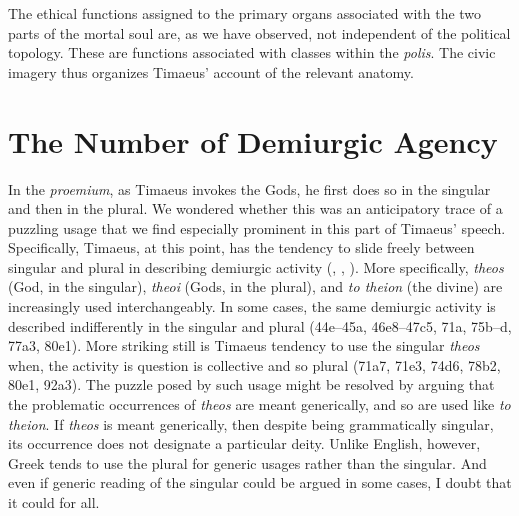 The ethical functions assigned to the primary organs associated with the two parts of the mortal soul are, as we have observed, not independent of the political topology. These are functions associated with classes within the \emph{polis}. The civic imagery thus organizes Timaeus' account of the relevant anatomy. 


\section{The Number of Demiurgic Agency} %
\label{sec:the_number_of_demiurgic_agency}

In the \emph{proemium}, as Timaeus invokes the Gods, he first does so in the singular and then in the plural. We wondered whether this was an anticipatory trace of a puzzling usage that we find especially prominent in this part of Timaeus' speech. Specifically, Timaeus, at this point, has the tendency to slide freely between singular and plural in describing demiurgic activity (\citealt[280]{Cornford:1935fk}, \citealt[169]{Grube:1935ad}, \citealt[608]{Cherniss:1944aa}). More specifically, \emph{theos} (God, in the singular), \emph{theoi} (Gods, in the plural), and \emph{to theion} (the divine) are increasingly used interchangeably. In some cases, the same demiurgic activity is described indifferently in the singular and plural (44e--45a, 46e8--47c5, 71a, 75b--d, 77a3, 80e1). More striking still is Timaeus tendency to use the singular \emph{theos} when, the activity is question is collective and so plural (71a7, 71e3, 74d6, 78b2, 80e1, 92a3). The puzzle posed by such usage might be resolved by arguing that the problematic occurrences of \emph{theos} are meant generically, and so are used like \emph{to theion}. If \emph{theos} is meant generically, then despite being grammatically singular, its occurrence does not designate a particular deity. Unlike English, however, Greek tends to use the plural for generic usages rather than the singular. And even if generic reading of the singular could be argued in some cases, I doubt that it could for all. 

